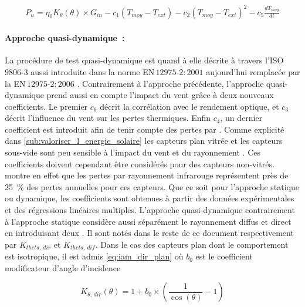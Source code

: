 \begin{equation}\label{eq:instantanee_complete}
    \begin{aligned}
        P_{u} = \eta_{0} K_{\theta}(\theta) \times G_{in} - c_{1} (T_{moy} - T_{ext}) - c_{2} (T_{moy}
                - T_{ext})^{2} - c_{5}\frac{dT_{moy}}{dt}
    \end{aligned}
\end{equation}


\paragraph{Approche quasi-dynamique~:} %
\label{par:approche_quasi_dynamique}
La procédure de test quasi-dynamique est quand à elle décrite à travers l’ISO\,$9806$-$3$
aussi introduite dans la norme EN\,$12975$-$2:2001$ \parencite{EN1297522001} aujourd’hui
remplacée par la EN\,$12975$-$2:2006$ \parencite{EN1297522006}.
Contrairement à l’approche précédente, l’approche quasi-dynamique prend aussi en
compte l’impact du vent grâce à deux nouveaux coefficients. Le premier $c_{6}$ décrit la
corrélation avec le rendement optique, et $c_{3}$ décrit l’influence
du vent sur les pertes thermiques. Enfin $c_{4}$, un dernier coefficient est introduit afin
de tenir compte des pertes par . Comme explicité dans \ref{sub:valoriser_l_energie_solaire}
les capteurs plan vitrée et les capteurs sous-vide sont peu sensible à l’impact du
vent et du rayonnement . Ces coefficients doivent cependant être considérés
pour des capteurs non-vitrés. \textcite{Hunn197733} montre en effet que les pertes
par rayonnement infrarouge représentent près de \SI{25}{\percent} des pertes annuelles
pour ces capteurs. Que ce soit pour l’approche statique ou dynamique, les coefficients
sont obtenues à partir des données expérimentales et des régressions linéaires multiples.
L’approche quasi-dynamique contrairement à l’approche statique considère aussi séparément
le rayonnement diffus et direct en introduisant deux . Il sont notés dans le reste
de ce document respectivement par $K_{theta,\,dir}$ et $K_{theta,\,dif}$.
Dans le cas des capteurs plan dont le comportement est
isotropique, il est admis \eqref{eq:iam_dir_plan} où $b_{0}$ est le coefficient
modificateur d’angle d’incidence \parencite{Zambolin20101382}

\begin{equation}\label{eq:iam_dir_plan}
    K_{\theta,\,dir} (\theta) = 1 + b_{0} \times \left(\frac{1}{\cos(\theta)} - 1\right)
\end{equation}

